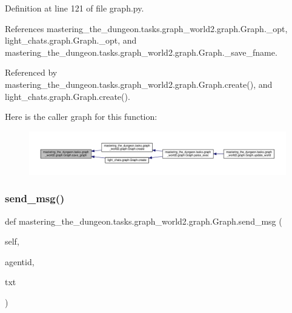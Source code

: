 Definition at line 121 of file graph.\+py.



References mastering\+\_\+the\+\_\+dungeon.\+tasks.\+graph\+\_\+world2.\+graph.\+Graph.\+\_\+opt, light\+\_\+chats.\+graph.\+Graph.\+\_\+opt, and mastering\+\_\+the\+\_\+dungeon.\+tasks.\+graph\+\_\+world2.\+graph.\+Graph.\+\_\+save\+\_\+fname.



Referenced by mastering\+\_\+the\+\_\+dungeon.\+tasks.\+graph\+\_\+world2.\+graph.\+Graph.\+create(), and light\+\_\+chats.\+graph.\+Graph.\+create().

Here is the caller graph for this function\+:
\nopagebreak
\begin{figure}[H]
\begin{center}
\leavevmode
\includegraphics[width=350pt]{classmastering__the__dungeon_1_1tasks_1_1graph__world2_1_1graph_1_1Graph_aa8ab08acb55e401a9e8f0deb501640bc_icgraph}
\end{center}
\end{figure}
\mbox{\label{classmastering__the__dungeon_1_1tasks_1_1graph__world2_1_1graph_1_1Graph_a4a99f9a773c1a5939fc45c50f92b4449}} 
\subsubsection{\texorpdfstring{send\+\_\+msg()}{send\_msg()}}
{\footnotesize\ttfamily def mastering\+\_\+the\+\_\+dungeon.\+tasks.\+graph\+\_\+world2.\+graph.\+Graph.\+send\+\_\+msg (\begin{DoxyParamCaption}\item[{}]{self,  }\item[{}]{agentid,  }\item[{}]{txt }\end{DoxyParamCaption})}



